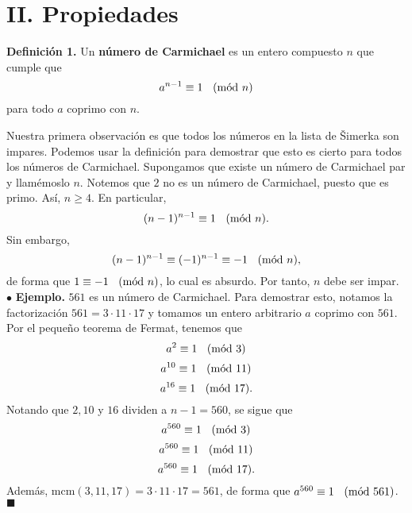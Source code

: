 \documentclass{article}
\theoremstyle{definition}
\newcommand{\Mod}[1]{\ \hspace{0.2cm} (\mathrm{m\acute{o}d}\ #1)}
\begin{document}
\section*{II. Propiedades}
\vspace{0.5cm}
\begin{mybox1}
	\textbf{Definición 1. } Un  \textbf{número de Carmichael} es un entero compuesto $n$ que cumple que  
	$$ a^{n-1} \equiv 1 \Mod{n} $$
	para todo $a$ coprimo con $n$.
\end{mybox1}	
\vspace{0.5cm}
Nuestra primera observación es que todos los números en la lista de Šimerka son impares. Podemos usar la definición para demostrar que esto es cierto para todos los números de Carmichael.  Supongamos que existe un número de Carmichael par y llamémoslo $n$. Notemos que $2$ no es un número de Carmichael, puesto que es primo. Así, $n \geq 4$. En particular, 
$$ (n-1)^{n-1} \equiv 1 \Mod{n} .$$
Sin embargo, 
$$ (n-1)^{n-1} \equiv (-1)^{n-1} \equiv -1 \Mod{n}  ,$$
de forma que $ 1 \equiv -1 \Mod{n}$, lo cual es absurdo. Por tanto, $n$ debe ser impar. \\

$\bullet$ \textbf{Ejemplo.} $561$ es un número de Carmichael. Para demostrar esto, notamos la factorización $561 = 3 \cdot 11 \cdot 17$ y tomamos un entero arbitrario $a$ coprimo con $561$. Por el pequeño teorema de Fermat, tenemos que
$$ a^2 \equiv 1 \Mod{3} $$
$$ a^{10} \equiv 1 \Mod{11} $$
$$ a^{16} \equiv 1 \Mod{17}. $$
Notando que $2, 10$ y $16$ dividen a $n - 1 = 560$, se sigue que
$$ a^{560} \equiv 1 \Mod{3} $$
$$ a^{560} \equiv 1 \Mod{11} $$
$$ a^{560} \equiv 1 \Mod{17}. $$
Además, $\text{mcm}(3, 11, 17) = 3 \cdot 11 \cdot 17 = 561$, de forma que $a^{560} \equiv 1 \Mod{561}$. \hspace{2cm}$\blacksquare$ \\
\end{document}
